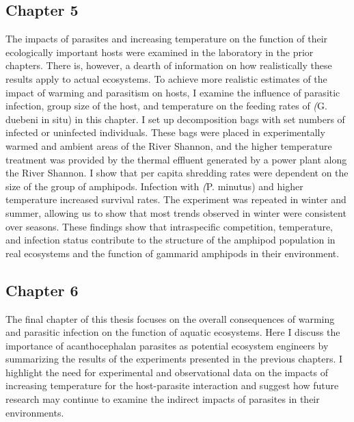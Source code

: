 \subsection{Chapter 5}
The impacts of parasites and increasing temperature on the function of their ecologically important hosts were examined in the laboratory in the prior chapters. There is, however, a dearth of information on how realistically these results apply to actual ecosystems. To achieve more realistic estimates of the impact of warming and parasitism on hosts, I examine the influence of parasitic infection, group size of the host, and temperature on the feeding rates of \emph(G. duebeni in situ) in this chapter. I set up decomposition bags with set numbers of infected or uninfected individuals. These bags were placed in experimentally warmed and ambient areas of the River Shannon, and the higher temperature treatment was provided by the thermal effluent generated by a power plant along the River Shannon. I show that per capita shredding rates were dependent on the size of the group of amphipods. Infection with \emph(P. minutus) and higher temperature increased survival rates. The experiment was repeated in winter and summer, allowing us to show that most trends observed in winter were consistent over seasons. These findings show that intraspecific competition, temperature, and infection status contribute to the structure of the amphipod population in real ecosystems and the function of gammarid amphipods in their environment. 

\subsection{Chapter 6}
The final chapter of this thesis focuses on the overall consequences of warming and parasitic infection on the function of aquatic ecosystems. Here I discuss the importance of acanthocephalan parasites as potential ecosystem engineers by summarizing the results of the experiments presented in the previous chapters. I highlight the need for experimental and observational data on the impacts of increasing temperature for the host-parasite interaction and suggest how future research may continue to examine the indirect impacts of parasites in their environments. 

%
